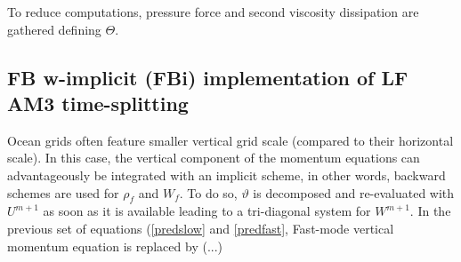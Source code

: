 \documentclass[a4paper,11pt]{article}
\begin{document}
 To reduce computations, pressure force and second viscosity dissipation are gathered defining $\Theta$. 
 
 
 \subsection{FB w-implicit (FBi) implementation of LF AM3 time-splitting}
 \label{Subsec-FBi}
Ocean grids often feature smaller vertical grid scale (compared to their horizontal scale). In this case, the vertical component of the momentum equations can advantageously be integrated with an implicit scheme, in other words, backward schemes are used for $\rho_f$ and $W_f$. To do so, $\vartheta$ is decomposed and re-evaluated with $U^{m+1}$ as soon as it is available leading to a tri-diagonal system for $W^{m+1}$. In the previous set of equations (\ref{predslow} and \ref{predfast}, Fast-mode vertical momentum equation is replaced by (...)\\
 
\end{document}
